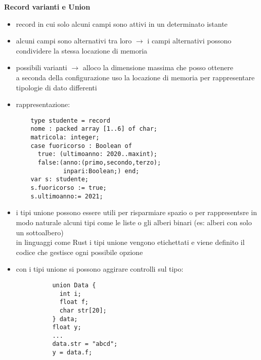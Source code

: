 \documentclass[12pt]{extarticle}
\begin{document}
\begin{flushleft}
\newpage

\textbf{Record varianti e Union}

\begin{itemize}
  \item record in cui solo alcuni campi sono attivi in un determinato istante
  \item alcuni campi sono alternativi tra loro $\rightarrow$  i campi alternativi possono condividere la stessa locazione di memoria
  \item possibili varianti $\rightarrow$  alloco la dimensione massima che posso ottenere \\
        a seconda della configurazione uso la locazione di memoria per rappresentare tipologie di dato differenti
  \item rappresentazione:
  \begin{lstlisting}
    type studente = record
    nome : packed array [1..6] of char;
    matricola: integer;
    case fuoricorso : Boolean of
      true: (ultimoanno: 2020..maxint);
      false:(anno:(primo,secondo,terzo);
             inpari:Boolean;) end;
    var s: studente;
    s.fuoricorso := true;
    s.ultimoanno:= 2021;
\end{lstlisting}
  \item i tipi unione possono essere utili per risparmiare spazio o per rappresentsre in modo naturale 
        alcuni tipi come le liste o gli alberi binari (es: alberi con solo un sottoalbero) \\
        in linguaggi come Rust i tipi unione vengono etichettati e viene definito il codice 
        che gestisce ogni possibile opzione
  \item con i tipi unione si possono aggirare controlli sul tipo:
        \begin{lstlisting}
          union Data {
            int i;
            float f;
            char str[20];
          } data;
          float y;
          ...
          data.str = "abcd";
          y = data.f;
        \end{lstlisting}
\end{itemize}


\end{flushleft}
\end{document}

